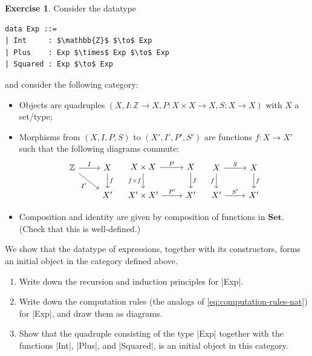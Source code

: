 \documentclass[a4paper,11pt, oneside,titlepage=false]{scrbook}
\theoremstyle{plain}
\theoremstyle{definition}
\newtheorem{exer}[thm]{Exercise}
\newcommand{\Catb}[1]{\mathbf{#1}}
\newcommand{\SET}{\Catb{Set}}
\begin{document}
\begin{exer}\label{exer:aexp}
  Consider the datatype
\begin{lstlisting}[mathescape=true]
data Exp ::=
| Int     : $\mathbb{Z}$ $\to$ Exp
| Plus    : Exp $\times$ Exp $\to$ Exp
| Squared : Exp $\to$ Exp
\end{lstlisting}
  and consider the following category:
  \begin{itemize}
  \item Objects are quadruples $(X, I : \mathbb{Z} \to X, P : X \times X \to X, S : X \to X)$ with $X$ a set/type;
  \item Morphisms from $(X, I, P, S)$ to $(X', I', P', S')$ are functions
    $f : X \to X'$ such that the following diagrams commute:
    \[
      \begin{tikzcd}
        \mathbb{Z} \ar[r, "I"] \ar[rd, "I'"']
        &
        X \ar[d, "f"]
        \\
        &
        X'
      \end{tikzcd}
      \quad
      \begin{tikzcd}
        X\times X \ar[r, "P"] \ar[d, "f \times f"']
        &
        X \ar[d, "f"]
        \\
        X' \times X' \ar[r, "P'"]
        &
        X'
      \end{tikzcd}
      \quad
      \begin{tikzcd}
        X \ar[r, "S"] \ar[d, "f"']
        &
        X \ar[d, "f"]
        \\
        X' \ar[r, "S'"]
        &
        X'
      \end{tikzcd}
    \]
  \item Composition and identity are given by composition of functions in $\SET$. (Check that this is well-defined.)
  \end{itemize}

We show that the datatype of expressions, together with its constructors, forms an initial object in the category defined above.

\begin{enumerate}
\item Write down the recursion and induction principles for |Exp|.
\item Write down the computation rules (the analogs of \cref{eq:computation-rules-nat}) for |Exp|, and draw them as diagrams.
\item Show that the quadruple consisting of the type |Exp| together with the functions |Int|, |Plus|, and |Squared|, is an initial object in this category.
\end{enumerate}

\end{exer}
\end{document}

